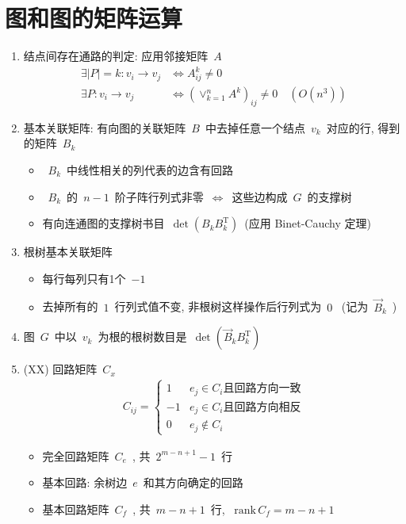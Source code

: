 \documentclass[11pt,a4paper]{article}%
\renewcommand{\[}{~$}
\renewcommand{\]}{$~}%
\newcommand{\rank}{\mathrm{rank}\,}
\begin{document}
\section{图和图的矩阵运算}
	\begin{enumerate}
	 \item 结点间存在通路的判定: 应用邻接矩阵\[A\]
	 	\begin{align*}
	 	  \exists |P|=k: v_i \to v_j &\Leftrightarrow A^k_{ij} \neq 0 \\
	 	  \exists P : v_i \to v_j &\Leftrightarrow \left(\lor_{k=1}^n A^k\right)_{ij} \neq 0\quad(O(n^3)) \label{existofpath}
	 	\end{align*}
	 \item 基本关联矩阵: 有向图的关联矩阵\[B\]中去掉任意一个结点\[v_k\]对应的行, 得到的矩阵\[B_k\]
	 	\begin{itemize}
	 	 \item \[B_k\]中线性相关的列代表的边含有回路
	 	 \item \[B_k\]的\[n-1\]阶子阵行列式非零\[\Leftrightarrow\]这些边构成\[G\]的支撑树
	 	 \item 有向连通图的支撑树书目\[\det (B_k B_k^{\mathrm T})\](应用 Binet-Cauchy 定理)
	 	\end{itemize}
	 	\item 根树基本关联矩阵
		 	\begin{itemize}
		 	 \item 每行每列只有1个\[-1\]
		 	 \item 去掉所有的\[1\]行列式值不变, 非根树这样操作后行列式为\[0\] (记为\[\vec B_k\])
		 	\end{itemize}
	 \item 图\[G\]中以\[v_k\]为根的根树数目是\[\det(\vec B_k B_k^{\mathrm T})\]
	 \item (XX) 回路矩阵\[C_x\]
	 	\begin{align*}
	 	 C_{ij} = \left\{\begin{array}{rr}
	 	  1 & e_j\in C_i \mbox{且回路方向一致}\\
	 	  -1 & e_j\in C_i \mbox{且回路方向相反}\\
	 	  0 & e_j \notin C_i
	 	 \end{array}\right.
	 	\end{align*}
	 	\begin{itemize}
	 	 \item 完全回路矩阵\[C_e\], 共\[2^{m-n+1}-1\]行
	 	 \item 基本回路: 余树边\[e\]和其方向确定的回路
	 	 \item 基本回路矩阵\[C_f\], 共\[m-n+1\]行, \[\rank C_f = m-n+1\]\\

\end{itemize}
\end{enumerate}
\end{document}
